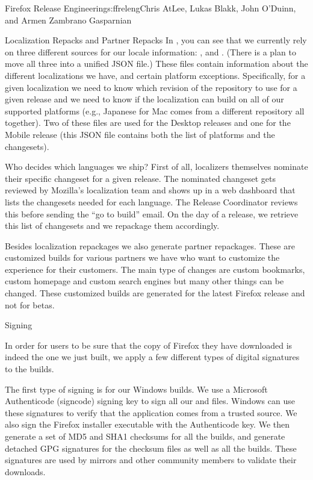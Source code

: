 \begin{aosachapter}{Firefox Release Engineering}{s:ffreleng}{Chris AtLee, Lukas Blakk, John O'Duinn, and Armen Zambrano Gasparnian}
\begin{aosasect1}{Localization Repacks and Partner Repacks}
In , you can see that we currently rely
on three different sources for our locale information:
,  and
. (There is a plan to move
all three into a unified JSON file.) These files contain information
about the different localizations we have, and certain platform
exceptions. Specifically, for a given localization we need to know
which revision of the repository to use for a given release and we
need to know if the localization can build on all of our supported
platforms (e.g.,  Japanese for Mac comes from a different repository all
together).  Two of these files are used for the Desktop releases and
one for the Mobile release (this JSON file contains both the list of
platforms and the changesets).

Who decides which languages we ship? First of all, localizers
themselves nominate their specific changeset for a given release. The
nominated changeset gets reviewed by Mozilla's localization team and
shows up in a web dashboard that lists the changesets needed for each
language. The Release Coordinator reviews this before sending the ``go
to build'' email. On the day of a release, we retrieve this list of
changesets and we repackage them accordingly.

Besides localization repackages we also generate partner
repackages. These are customized builds for various partners we have
who want to customize the experience for their customers.  The main
type of changes are custom bookmarks, custom homepage and custom
search engines but many other things can be changed. These customized
builds are generated for the latest Firefox release and not for betas.

\end{aosasect1}

\begin{aosasect1}{Signing}

In order for users to be sure that the copy of Firefox they have
downloaded is indeed the one we just built, we apply a few different
types of digital signatures to the builds.

The first type of signing is for our Windows builds. We use a
Microsoft Authenticode (signcode) signing key to sign all our
 and  files. Windows can use these signatures to
verify that the application comes from a trusted source. We also sign
the Firefox installer executable with the Authenticode key.  We then
generate a set of MD5 and SHA1 checksums for all the builds, and
generate detached GPG signatures for the checksum files as well as all
the builds. These signatures are used by mirrors and other community
members to validate their downloads.


\end{aosasect1}
\end{aosachapter}
